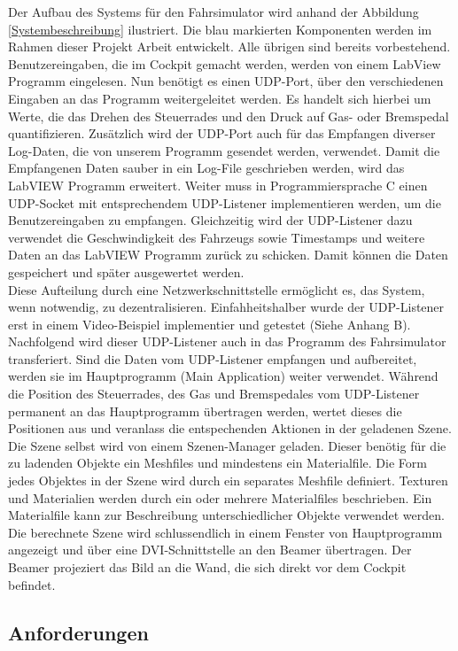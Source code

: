 Der Aufbau des Systems für den Fahrsimulator wird anhand der Abbildung \ref{Systembeschreibung} ilustriert. Die blau markierten Komponenten werden im Rahmen dieser Projekt Arbeit entwickelt. Alle übrigen sind bereits vorbestehend. 
Benutzereingaben, die im Cockpit gemacht werden, werden von einem LabView Programm eingelesen. Nun benötigt es einen UDP-Port,  über den verschiedenen Eingaben an das Programm weitergeleitet werden. Es handelt sich hierbei um Werte, die das Drehen des Steuerrades und den Druck auf Gas- oder Bremspedal quantifizieren. Zusätzlich wird der UDP-Port auch für das Empfangen diverser Log-Daten, die von unserem Programm gesendet werden, verwendet. Damit die Empfangenen Daten sauber in ein Log-File geschrieben werden, wird das LabVIEW Programm erweitert. 
Weiter  muss in Programmiersprache C einen UDP-Socket mit entsprechendem UDP-Listener implementieren werden, um die Benutzereingaben zu empfangen. Gleichzeitig wird der UDP-Listener dazu verwendet die Geschwindigkeit des Fahrzeugs sowie Timestamps und weitere Daten an das LabVIEW Programm zurück zu schicken. Damit können die Daten gespeichert und später ausgewertet werden.
\\
Diese Aufteilung durch eine Netzwerkschnittstelle ermöglicht es,  das System, wenn notwendig, zu dezentralisieren. Einfahheitshalber wurde der UDP-Listener erst in einem Video-Beispiel implementier und getestet (Siehe Anhang B). Nachfolgend wird dieser UDP-Listener auch in das Programm des Fahrsimulator transferiert.
Sind die Daten vom UDP-Listener empfangen und aufbereitet, werden sie im Hauptprogramm (Main Application) weiter verwendet. Während die Position des Steuerrades, des Gas und Bremspedales vom UDP-Listener permanent an das Hauptprogramm übertragen werden, wertet dieses die Positionen aus und veranlass die entspechenden Aktionen in der geladenen Szene. 
Die Szene selbst wird von einem Szenen-Manager geladen. Dieser benötig für die zu ladenden Objekte ein Meshfiles und mindestens ein Materialfile. Die Form jedes Objektes in der Szene wird durch ein separates Meshfile definiert. Texturen und Materialien werden durch ein oder mehrere Materialfiles beschrieben. Ein Materialfile kann zur Beschreibung unterschiedlicher Objekte verwendet werden. Die berechnete Szene wird schlussendlich in einem Fenster von Hauptprogramm angezeigt und über eine DVI-Schnittstelle an den Beamer übertragen. Der Beamer projeziert das Bild an die Wand, die sich direkt vor dem Cockpit befindet. 

\subsection{Anforderungen}
